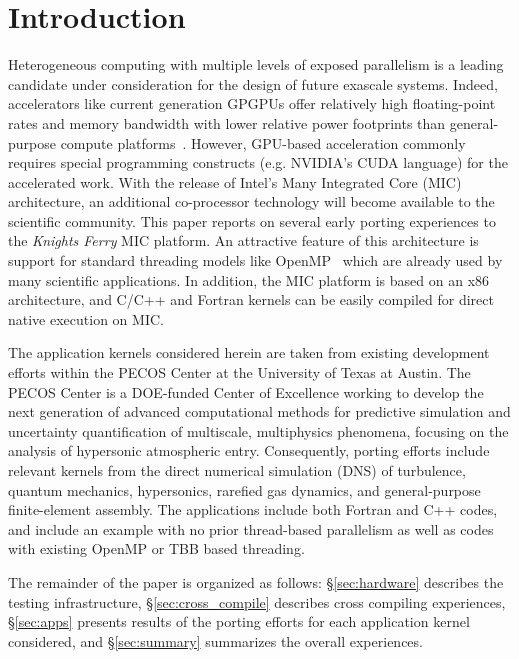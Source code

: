 \section{Introduction}
\label{sec:intro}

Heterogeneous computing with multiple levels of exposed parallelism is
a leading candidate under consideration for the design of
future exascale systems.
Indeed, accelerators like
current generation GPGPUs offer relatively high floating-point rates
and memory bandwidth with lower relative power footprints than
general-purpose compute platforms~\cite{gpu_hpc:2009}. However, 
GPU-based acceleration commonly requires special
programming constructs (e.g. NVIDIA's CUDA language) for the
accelerated work.
With the release of Intel's Many Integrated Core (MIC)
architecture, an additional co-processor technology will become
available to the scientific community.  This paper reports on
several early porting experiences to the {\em Knights Ferry} MIC
platform. An attractive feature of this architecture is 
support for standard threading models like
OpenMP~\cite{openmp_standard} which are
already used by many scientific applications.  In addition, the MIC
platform is based on an x86 architecture, and C/C++ and Fortran
kernels can be easily compiled for direct native execution on MIC.

The application kernels considered herein are taken from existing
development efforts within the PECOS Center at the University of
Texas at Austin.  The PECOS Center is a DOE-funded Center of
Excellence working to develop the next generation of advanced
computational methods for predictive simulation and uncertainty
quantification of multiscale, multiphysics phenomena, focusing on the
analysis of
hypersonic atmospheric entry.  Consequently, porting efforts
include relevant kernels from the direct numerical simulation (DNS) of
turbulence, quantum mechanics, hypersonics, rarefied gas dynamics, and
general-purpose finite-element assembly. 
The applications include 
both Fortran and C++ codes, and include an example with no prior
thread-based parallelism as well as codes with existing OpenMP or TBB
based threading.

The remainder of the paper is organized as follows:
\S\ref{sec:hardware} describes the testing infrastructure,
\S\ref{sec:cross_compile} describes
cross compiling experiences, \S\ref{sec:apps} presents
results of the porting efforts for each application kernel
considered, and \S\ref{sec:summary} summarizes the overall experiences.

